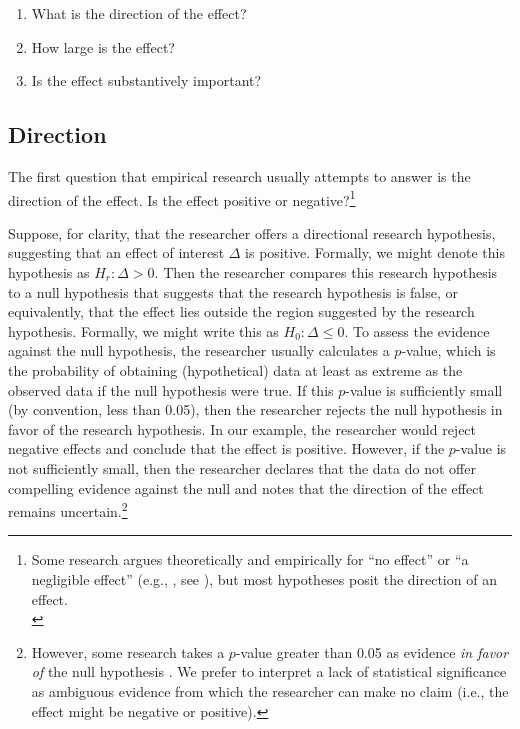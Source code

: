\documentclass[12pt]{article}
\begin{document}
\begin{enumerate}
\item What is the direction of the effect?
\item How large is the effect?
\item Is the effect substantively important?
\end{enumerate}

\subsection*{Direction}

The first question that empirical research usually attempts to answer is the direction of the effect. Is the effect positive or negative?\footnote{\normalbaselineskip Some research argues theoretically and empirically for ``no effect'' or ``a negligible effect'' (e.g., \citealt{KamPalmer2008}, see \citealt{Rainey2014}), but most hypotheses posit the direction of an effect.\\} 

Suppose, for clarity, that the researcher offers a directional research hypothesis, suggesting that an effect of interest $\Delta$ is positive. Formally, we might denote this hypothesis as $H_r: \Delta > 0$. Then the researcher compares this research hypothesis to a null hypothesis that suggests that the research hypothesis is false, or equivalently, that the effect lies outside the region suggested by the research hypothesis. Formally, we might write this as $H_0: \Delta \leq 0$. To assess the evidence against the null hypothesis, the researcher usually calculates a $p$-value, which is the probability of obtaining (hypothetical) data at least as extreme as the observed data if the null hypothesis were true. If this $p$-value is sufficiently small (by convention, less than 0.05), then the researcher rejects the null hypothesis in favor of the research hypothesis. In our example, the researcher would reject negative effects and conclude that the effect is positive. However, if the $p$-value is not sufficiently small, then the researcher declares that the data do not offer compelling evidence against the null and notes that the direction of the effect remains uncertain.\footnote{\normalbaselineskip However, some research takes a $p$-value greater than 0.05 as evidence \textit{in favor of} the null hypothesis \citep{Rainey2014}. We prefer to interpret a lack of statistical significance as ambiguous evidence from which the researcher can make no claim (i.e., the effect might be negative or positive).}
\end{document}
